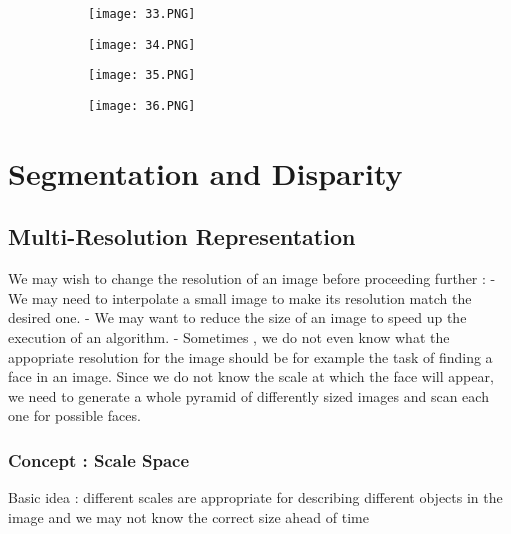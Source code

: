 \documentclass{article}
\begin{document}
\begin{figure}[ht!]
  \centering
  \begin{subfigure}[b]{0.4\linewidth}
    \texttt{[image: 33.PNG]}
  \end{subfigure}
  \begin{subfigure}[b]{0.4\textwidth}
         \centering
         \texttt{[image: 34.PNG]}
     \end{subfigure}
\end{figure}


\begin{figure}[ht!]
  \centering
  \begin{subfigure}[b]{0.4\linewidth}
    \texttt{[image: 35.PNG]}
  \end{subfigure}
  \begin{subfigure}[b]{0.4\textwidth}
         \centering
         \texttt{[image: 36.PNG]}
     \end{subfigure}
\end{figure}

\section{Segmentation and Disparity}


\subsection{Multi-Resolution Representation}

We may wish to change the resolution of an image before proceeding further : - We may need to interpolate a small image to make its resolution match the desired one.
- We may want to reduce the size of an image to speed up the execution of an algorithm.
- Sometimes , we do not even know what the appopriate resolution for the image should be for example the task of finding a face in an image. Since we do not know the scale at which the face will appear, we need to generate a whole pyramid of differently sized images and scan each one for possible faces.

\subsubsection{Concept : Scale Space}

Basic idea : different scales are appropriate for describing different objects in the image and we may not know the correct size ahead of time
\end{document}
